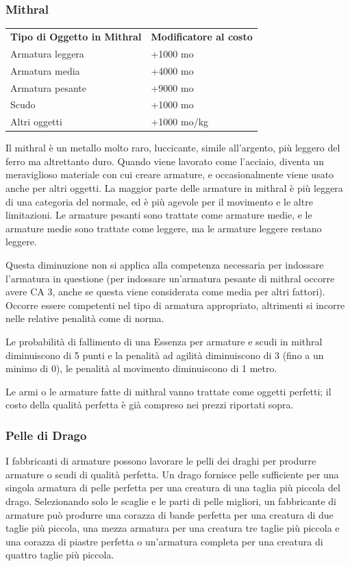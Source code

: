\documentclass[a4paper,11pt,twoside,openany]{book}
\begin{document}
{\subsubsection{Mithral}

\label{mithral}

\begin{tabular}{ll}
\toprule
\textbf{Tipo di Oggetto in Mithral} & \textbf{Modificatore al costo}\tabularnewline
Armatura leggera & +1000 mo\tabularnewline
Armatura media & +4000 mo\tabularnewline
Armatura pesante & +9000 mo\tabularnewline
Scudo & +1000 mo\tabularnewline
Altri oggetti & +1000 mo/kg\tabularnewline
\end{tabular}

\bigskip

Il mithral è un metallo molto raro, luccicante, simile all'argento, più leggero del ferro ma altrettanto duro. Quando viene lavorato come l'acciaio, diventa un meraviglioso materiale con cui creare armature, e occasionalmente viene usato anche per altri oggetti. La maggior parte delle armature in mithral è più leggera di una categoria del normale, ed è più agevole per il movimento e le altre limitazioni. Le armature pesanti sono trattate come armature medie, e le armature medie sono trattate come leggere, ma le armature leggere restano leggere.

Questa diminuzione non si applica alla competenza necessaria per indossare l'armatura in questione (per indossare un'armatura pesante di mithral occorre avere CA 3, anche se questa viene considerata come media per altri fattori). Occorre essere competenti nel tipo di armatura appropriato, altrimenti si incorre nelle relative penalità come di norma.

Le probabilità di fallimento di una Essenza per armature e scudi in mithral diminuiscono di 5 punti e la penalità ad agilità diminuiscono di 3 (fino a un minimo di 0), le penalità al movimento diminuiscono di 1 metro.

Le armi o le armature fatte di mithral vanno trattate come oggetti perfetti; il costo della qualità perfetta è già compreso nei prezzi riportati sopra.

\subsubsection{Pelle di Drago}

\label{pelle-di-drago}

I fabbricanti di armature possono lavorare le pelli dei draghi per produrre armature o scudi di qualità perfetta.
Un drago fornisce pelle sufficiente per una singola armatura di pelle perfetta per una creatura di una taglia più piccola del drago. Selezionando solo le scaglie e le parti di pelle migliori, un fabbricante di armature può produrre una corazza di bande perfetta per una creatura di due taglie più piccola, una mezza armatura per una creatura tre taglie più piccola e una corazza di piastre perfetta o un'armatura completa per una creatura di quattro taglie più piccola. 

}
\end{document}
